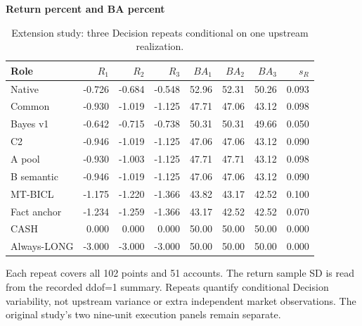 \begin{table}[p]
\centering\small
\setlength{\tabcolsep}{3pt}
\renewcommand{\arraystretch}{1.12}
\caption{Extension study: three Decision repeats conditional on one upstream realization.}
\label{tab:u09-repeats}
\textbf{Return percent and BA percent}\par\smallskip
\begin{tabular}{lrrrrrrr}
\hline
Role & $R_1$ & $R_2$ & $R_3$ & $BA_1$ & $BA_2$ & $BA_3$ & $s_R$ \\
\hline
Native & -0.726 & -0.684 & -0.548 & 52.96 & 52.31 & 50.26 & 0.093 \\
Common & -0.930 & -1.019 & -1.125 & 47.71 & 47.06 & 43.12 & 0.098 \\
Bayes v1 & -0.642 & -0.715 & -0.738 & 50.31 & 50.31 & 49.66 & 0.050 \\
C2 & -0.946 & -1.019 & -1.125 & 47.06 & 47.06 & 43.12 & 0.090 \\
A pool & -0.930 & -1.003 & -1.125 & 47.71 & 47.71 & 43.12 & 0.098 \\
B semantic & -0.946 & -1.019 & -1.125 & 47.06 & 47.06 & 43.12 & 0.090 \\
MT-BICL & -1.175 & -1.220 & -1.366 & 43.82 & 43.17 & 42.52 & 0.100 \\
Fact anchor & -1.234 & -1.259 & -1.366 & 43.17 & 42.52 & 42.52 & 0.070 \\
CASH & 0.000 & 0.000 & 0.000 & 50.00 & 50.00 & 50.00 & 0.000 \\
Always-LONG & -3.000 & -3.000 & -3.000 & 50.00 & 50.00 & 50.00 & 0.000 \\
\hline
\end{tabular}\par\medskip
\begin{minipage}{\textwidth}\footnotesize Each repeat covers all 102 points and 51 accounts. The return sample SD is read from the recorded ddof=1 summary. Repeats quantify conditional Decision variability, not upstream variance or extra independent market observations. The original study's two nine-unit execution panels remain separate.\end{minipage}
\end{table}
